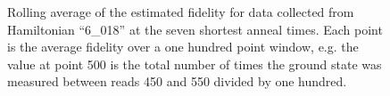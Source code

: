 \begin{figure}
	\caption[Rolling Fidelity Average]{Rolling average of the estimated fidelity for data collected from Hamiltonian ``6\_018'' at the seven shortest anneal times.  Each point is the average fidelity over a one hundred point window, e.g. the value at point 500 is the total number of times the ground state was measured between reads 450 and 550 divided by one hundred.}
	\label{fig:rolling_avg}
\end{figure}
